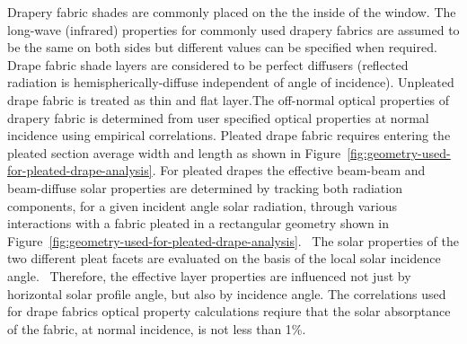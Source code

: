 Drapery fabric shades are commonly placed on the the inside of the window. The long-wave (infrared) properties for commonly used drapery fabrics are assumed to be the same on both sides but different values can be specified when required. Drape fabric shade layers are considered to be perfect diffusers (reflected radiation is hemispherically-diffuse independent of angle of incidence). Unpleated drape fabric is treated as thin and flat layer.The off-normal optical properties of drapery fabric is determined from user specified optical properties at normal incidence using empirical correlations. Pleated drape fabric requires entering the pleated section average width and length as shown in Figure~\ref{fig:geometry-used-for-pleated-drape-analysis}. For pleated drapes the effective beam-beam and beam-diffuse solar properties are determined by tracking both radiation components, for a given incident angle solar radiation, through various interactions with a fabric pleated in a rectangular geometry shown in Figure~\ref{fig:geometry-used-for-pleated-drape-analysis}.~ The solar properties of the two different pleat facets are evaluated on the basis of the local solar incidence angle.~ Therefore, the effective layer properties are influenced not just by horizontal solar profile angle, but also by incidence angle. The correlations used for drape fabrics optical property calculations reqiure that the solar absorptance of the fabric, at normal incidence, is not less than 1\%.

